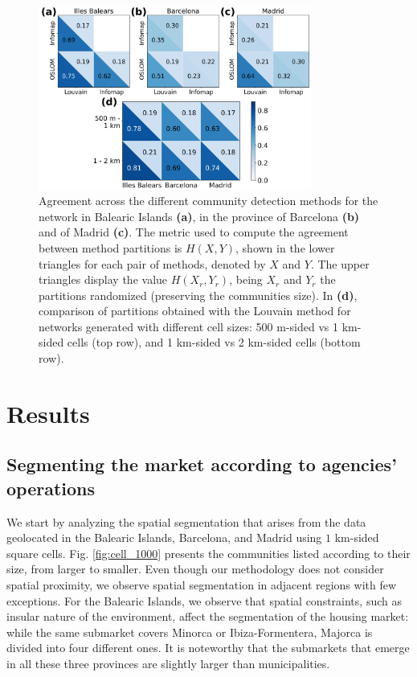\begin{figure}[t]
    \centering
    \includegraphics[width = 0.8\textwidth]{Figs/Idealista_segmentation/Agreement_method_scale.pdf}
	\caption[Agreement across three methods and cell sizes.]{ Agreement across the different community detection methods for the network in Balearic Islands \textbf{(a)}, in the province of Barcelona \textbf{(b)} and of Madrid \textbf{(c)}. The metric used to compute the agreement between method partitions is $H(X,Y)$, shown in the lower triangles for each pair of methods, denoted by $X$ and $Y$. The upper triangles display the value $H(X_r,Y_r)$, being $X_r$ and $Y_r$ the partitions randomized (preserving the communities size). In \textbf{(d)}, comparison of partitions obtained with the Louvain method for networks generated with different cell sizes: 500 m-sided vs  1 km-sided cells (top row), and 1 km-sided vs 2 km-sided cells (bottom row). \label{fig:agreement_scale_method}}
\end{figure}

\section{Results}
\label{sec:results}

\subsection{Segmenting the market according to agencies' operations}\label{sec:segmentation_cells}

We start by analyzing the spatial segmentation that arises from the data geolocated in the Balearic Islands, Barcelona, and Madrid using $1$ km-sided square cells. Fig. \ref{fig:cell_1000} presents the communities listed according to their size, from larger to smaller. Even though our methodology does not consider spatial proximity, we observe spatial segmentation in adjacent regions with few exceptions. For the Balearic Islands, we observe that spatial constraints, such as insular nature of the environment, affect the segmentation of the housing market: while the same submarket covers Minorca or Ibiza-Formentera, Majorca is divided into four different ones. It is noteworthy that the submarkets that emerge in all these three provinces are slightly larger than municipalities.


